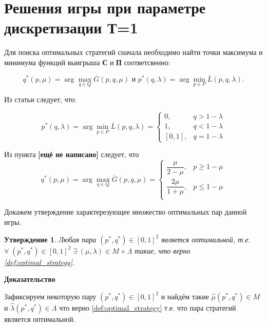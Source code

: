 \section{Решения игры при параметре дискретизации Т=1}

Для поиска оптимальных стратегий сначала необходимо найти точки максимума и минимума 
функций выигрыша \textbf{С} и \textbf{П} соответсвенно:

$$
	q^*(p, \mu) = \arg \max \limits_{q \in Q} \overline G(p, q, \mu)
	\textrm{ и }
	p^*(q, \lambda) = \arg \min \limits_{p \in P} \overline L(p, q, \lambda).
$$

Из статьи \cite{novikova} следует, что:

\begin{equation}
	p^*(q, \lambda)=
	\arg \min \limits_{p \in P} \overline L(p, q, \lambda) =
	\begin{cases}
		0, & q > 1 - \lambda \\
		1, & q < 1 - \lambda \\
		[0,1], & q = 1 - \lambda
	\end{cases}
	\label{eq:argmin_L_1}
\end{equation}

Из пункта \textbf{[ещё не написано]} следует, что
\begin{equation}
	q^*(p, \mu) = \arg \max \limits_{q \in Q} \overline G(p, q, \mu) =
	\begin{cases}
		\dfrac{\mu}{2 - \mu}, & p \geqslant 1 - \mu \\
		\dfrac{2\mu}{1 + \mu}, & p \leqslant 1 -\mu \\
	\end{cases}
	\label{eq:argmax_G_1}
\end{equation}

Докажем утверждение характерезующее множество оптимальных пар данной игры.

\newtheorem{State}{Утверждение}\label{State:opt_strat_1}
\begin{State}
	Любая пара $(p^*, q^*) \in [0, 1]^2$ является оптимальной, т.е.  
	$\forall \; (p^*, q^*) \in [0, 1]^2 \; \exists \; 
	(\mu, \lambda) \in M \times \Lambda$
	такие, что верно \eqref{def:optimal_strategy}.
\end{State}


\textbf{Доказательство}

Зафиксируем некоторую пару  $(p^*, q^*) \in [0, 1]^2$ и найдём такие 
$\hat \mu (p^*, q^*) \in M$ и $\hat \lambda (p^*, q^*) \in \Lambda$ 
что верно \eqref{def:optimal_strategy} т.е. что пара стратегий является оптимальной.


